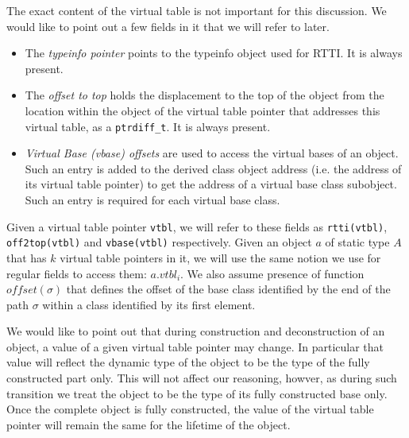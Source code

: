 \documentclass[preprint]{sigplanconf}
\makeatletter
\DeclareRobustCommand{\code}[1]{{\lstinline[breaklines=false,escapechar=@]{#1}}}
\makeatother
\begin{document}
The exact content of the virtual table is not important for this discussion. We 
would like to point out a few fields in it that we will refer to later.

\begin{itemize}
\item The \emph{typeinfo pointer} points to the typeinfo object used for RTTI. 
      It is always present.  
\item The \emph{offset to top} holds the displacement to the top of the object 
      from the location within the object of the virtual table pointer that 
      addresses this virtual table, as a \code{ptrdiff_t}. It is always present.
\item \emph{Virtual Base (vbase) offsets} are used to access the virtual bases 
      of an object. Such an entry is added to the derived class object address 
      (i.e. the address of its virtual table pointer) to get the address of a 
      virtual base class subobject. Such an entry is required for each virtual 
      base class.
\end{itemize}

\noindent
Given a virtual table pointer \code{vtbl}, we will refer to these fields as 
\code{rtti(vtbl)}, \code{off2top(vtbl)} and \code{vbase(vtbl)} respectively. 
Given an object $a$ of static type $A$ that has $k$ virtual table pointers in 
it, we will use the same notion we use for regular fields to access them: 
$a.vtbl_i$. We also assume presence of function $offset(\sigma)$ that defines 
the offset of the base class identified by the end of the path $\sigma$ within a 
class identified by its first element.

We would like to point out that during construction and deconstruction of an 
object, a value of a given virtual table pointer may change. In particular that 
value will reflect the dynamic type of the object to be the type of the fully 
constructed part only. This will not affect our reasoning, howver, as during 
such transition we treat the object to be the type of its fully constructed 
base only. Once the complete object is fully constructed, the value of the 
virtual table pointer will remain the same for the lifetime of the object.

\end{document}
